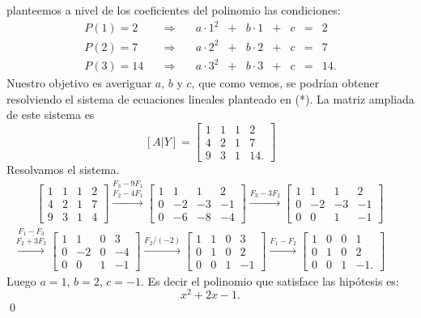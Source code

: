 \begin{enumerate}[topsep=6pt, itemsep=.4cm]
\rta planteemos a nivel de los coeficientes del polinomio las condiciones:
\begin{equation*}
 \begin{array}{rrrrrrrrr}
 P(1) =2 &\quad \Rightarrow \quad& a\cdot 1^2 &+ & b \cdot 1 &+ & c &= & 2 \\   
 P(2) =7 &\quad \Rightarrow \quad& a\cdot 2^2 &+ & b \cdot 2 &+ & c &= & 7 \\
 P(3) =14 &\quad \Rightarrow \quad& a\cdot 3^2 &+ & b \cdot 3 &+ & c &= & 14.    
\end{array} \tag{*}
\end{equation*}
Nuestro objetivo es averiguar $a$, $b$ y $c$,  que como vemos, se podrían obtener resolviendo el sistema de ecuaciones lineales planteado en (*). La matriz ampliada de este sistema es 
$$
[A|Y] = \left[\begin{array}{ccc|c}
1&1&1&2 \\
4&2&1&7\\
9&3&1&14.
\end{array}\right]
$$
Resolvamos el sistema.
\begin{multline*}\qquad
\left[\begin{array}{ccc|c}
1&1&1&2 \\
4&2&1&7\\
9&3&1&4
\end{array}\right] \stackrel{F_3 - 9F_1}{\stackrel{F_2 - 4 F_1}{\longrightarrow}}
\left[\begin{array}{ccc|c}
1&1&1&2 \\
0&-2&-3&-1\\
0&-6&-8&-4
\end{array}\right]\stackrel{F_3 - 3 F_2}{\longrightarrow}
\left[\begin{array}{ccc|c}
1&1&1&2 \\
0&-2&-3&-1\\
0&0&1&-1
\end{array}\right] \\
\stackrel{F_1 - F_3}{\stackrel{F_2 + 3 F_3}{\longrightarrow}}
\left[\begin{array}{ccc|c}
1&1&0&3 \\
0&-2&0&-4\\
0&0&1&-1
\end{array}\right]\stackrel{F_2/(-2)}{\longrightarrow}
\left[\begin{array}{ccc|c}
1&1&0&3 \\
0&1&0&2\\
0&0&1&-1
\end{array}\right]\stackrel{F_1 -F_2}{\longrightarrow}
\left[\begin{array}{ccc|c}
1&0&0&1 \\
0&1&0&2\\
0&0&1&-1.
\end{array}\right]
\qquad
\end{multline*}
Luego $a = 1$, $b =2$, $c=-1$. Es decir el polinomio que satisface las hipótesis es:
$$
x^2 + 2x -1.
$$
\qed


\end{enumerate}
